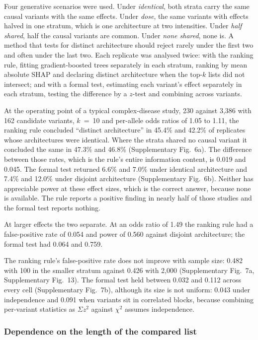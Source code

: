 \documentclass[10pt]{article}
\begin{document}
Four generative scenarios were used. Under \textit{identical}, both strata carry the same causal
variants with the same effects. Under \textit{dose}, the same variants with effects halved in one
stratum, which is one architecture at two intensities. Under \textit{half shared}, half the
causal variants are common. Under \textit{none shared}, none is. A method that tests for distinct
architecture should reject rarely under the first two and often under the last two. Each
replicate was analysed twice: with the ranking rule, fitting gradient-boosted trees separately in
each stratum, ranking by mean absolute SHAP and declaring distinct architecture when the top-$k$
lists did not intersect; and with a formal test, estimating each variant's effect separately in
each stratum, testing the difference by a $z$-test and combining across variants.

At the operating point of a typical complex-disease study, 230 against 3,386 with 162 candidate
variants, $k$~=~10 and per-allele odds ratios of 1.05 to 1.11, the ranking rule concluded
``distinct architecture'' in 45.4\% and 42.2\% of replicates whose architectures were identical.
Where the strata shared no causal variant it concluded the same in 47.3\% and 46.8\%
(Supplementary Fig.~6a). The difference between those rates, which is the rule's entire information content,
is 0.019 and 0.045. The formal test returned 6.6\% and 7.0\% under identical architecture and
7.4\% and 12.0\% under disjoint architecture (Supplementary Fig.~6b). Neither has appreciable power at these
effect sizes, which is the correct answer, because none is available. The rule reports a positive
finding in nearly half of those studies and the formal test reports nothing.

At larger effects the two separate. At an odds ratio of 1.49 the ranking rule had a false-positive
rate of 0.054 and power of 0.560 against disjoint architecture; the formal test had 0.064 and
0.759.

The ranking rule's false-positive rate does not improve with sample size: 0.482 with 100 in the
smaller stratum against 0.426 with 2,000 (Supplementary Fig.~7a, Supplementary Fig.~13). The formal test held between 0.032 and 0.112
across every cell (Supplementary Fig.~7b), although its size is not uniform: 0.043 under independence and 0.091
when variants sit in correlated blocks, because combining per-variant statistics as $\Sigma z^2$
against $\chi^2$ assumes independence.

\subsubsection*{Dependence on the length of the compared list}
\end{document}
